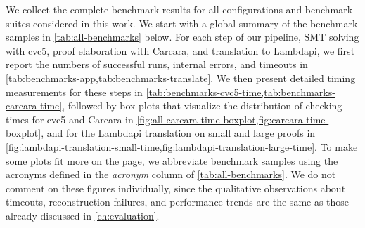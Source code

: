 We collect the complete benchmark results for all configurations and benchmark suites considered in this work.
We start with a global summary of the benchmark samples in \cref{tab:all-benchmarks} below.
For each step of our pipeline, SMT solving with cvc5, proof elaboration with Carcara, and translation to Lambdapi, we first report the numbers of successful runs, internal errors, and timeouts in \cref{tab:benchmarks-app,tab:benchmarks-translate}.
We then present detailed timing measurements for these steps in \cref{tab:benchmarks-cvc5-time,tab:benchmarks-carcara-time},
followed by box plots that visualize the distribution of checking times for cvc5 and Carcara in \cref{fig:all-carcara-time-boxplot,fig:carcara-time-boxplot},
and for the Lambdapi translation on small and large proofs in \cref{fig:lambdapi-translation-small-time,fig:lambdapi-translation-large-time}.
To make some plots fit more on the page, we abbreviate benchmark samples using the acronyms defined in the \emph{acronym} column of \cref{tab:all-benchmarks}.
We do not comment on these figures individually, since the qualitative observations about timeouts, reconstruction failures,
and performance trends are the same as those already discussed in \cref{ch:evaluation}.


\begin{table}[t]
\centering
\caption{Summary of benchmark.}
{%
\tiny
{}%
}
\label{tab:all-benchmarks}
\end{table}


\begin{table}[t]
\centering
\caption{cvc5 and Alethe elaboration results.}
{%
\tiny
{}%
}
\label{tab:benchmarks-app}
\end{table}

